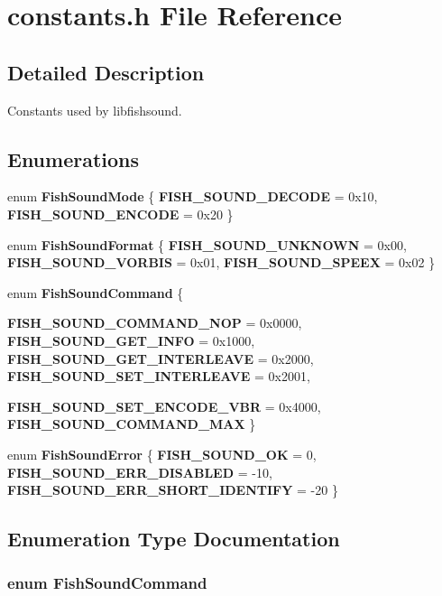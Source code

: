 \section{constants.h File Reference}
\label{constants_8h}


\subsection{Detailed Description}
Constants used by libfishsound. 



\subsection*{Enumerations}
\begin{CompactItemize}
\item 
enum {\bf Fish\-Sound\-Mode} \{ {\bf FISH\_\-SOUND\_\-DECODE} =  0x10, 
{\bf FISH\_\-SOUND\_\-ENCODE} =  0x20
 \}
\item 
enum {\bf Fish\-Sound\-Format} \{ {\bf FISH\_\-SOUND\_\-UNKNOWN} =  0x00, 
{\bf FISH\_\-SOUND\_\-VORBIS} =  0x01, 
{\bf FISH\_\-SOUND\_\-SPEEX} =  0x02
 \}
\item 
enum {\bf Fish\-Sound\-Command} \{ \par
{\bf FISH\_\-SOUND\_\-COMMAND\_\-NOP} =  0x0000, 
{\bf FISH\_\-SOUND\_\-GET\_\-INFO} =  0x1000, 
{\bf FISH\_\-SOUND\_\-GET\_\-INTERLEAVE} =  0x2000, 
{\bf FISH\_\-SOUND\_\-SET\_\-INTERLEAVE} =  0x2001, 
\par
{\bf FISH\_\-SOUND\_\-SET\_\-ENCODE\_\-VBR} =  0x4000, 
{\bf FISH\_\-SOUND\_\-COMMAND\_\-MAX}
 \}
\item 
enum {\bf Fish\-Sound\-Error} \{ {\bf FISH\_\-SOUND\_\-OK} =  0, 
{\bf FISH\_\-SOUND\_\-ERR\_\-DISABLED} =  -10, 
{\bf FISH\_\-SOUND\_\-ERR\_\-SHORT\_\-IDENTIFY} =  -20
 \}
\end{CompactItemize}


\subsection{Enumeration Type Documentation}
\subsubsection{\setlength{\rightskip}{0pt plus 5cm}enum {\bf Fish\-Sound\-Command}}\label{constants_8h_a16}


